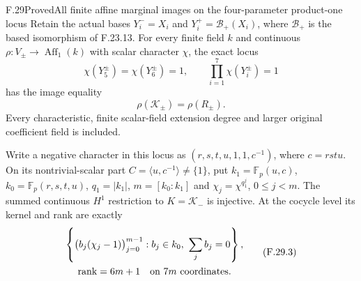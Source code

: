 \begin{claim}{F.29}{Proved}{All finite affine marginal images on the four-parameter product-one locus}
Retain the actual bases $Y_i^-=X_i$ and
$Y_i^+=\mathcal B_+(X_i)$, where $\mathcal B_+$
is the based isomorphism of F.23.13.
For every finite field $k$ and continuous
$\rho:V_\pm\to\operatorname{Aff}_1(k)$ with
scalar character $\chi$, the exact locus
\[
 \chi(Y_5^\pm)=\chi(Y_6^\pm)=1,
 \qquad \prod_{i=1}^7\chi(Y_i^\pm)=1
                                                               \tag{F.29.1}
\]
has the image equality
\[
                         \rho(\mathcal K_\pm)=\rho(R_\pm).
                                                               \tag{F.29.2}
\]
Every characteristic, finite scalar-field extension
degree and larger original coefficient field is included.

Write a negative character in this locus as
$(r,s,t,u,1,1,c^{-1})$, where $c=rstu$.
On its nontrivial-scalar part
$C=\langle u,c^{-1}\rangle\ne\{1\}$, put
$k_1=\mathbb F_p(u,c)$, $k_0=\mathbb F_p(r,s,t,u)$,
$q_1=|k_1|$, $m=[k_0:k_1]$ and
$\chi_j=\chi^{q_1^j}$, $0\leq j<m$.
The summed continuous $H^1$ restriction to
$K=\mathcal K_-$ is injective. At the cocycle
level its kernel and rank are exactly
\[
 \begin{gathered}
 \left\{\bigl(b_j(\chi_j-1)\bigr)_{j=0}^{m-1}:
                 b_j\in k_0,\ \sum_jb_j=0\right\},\\
                       \operatorname{rank}=6m+1
                 \quad\hbox{on }7m\hbox{ coordinates}.
 \end{gathered}                                                \tag{F.29.3}
\]
\end{claim}

